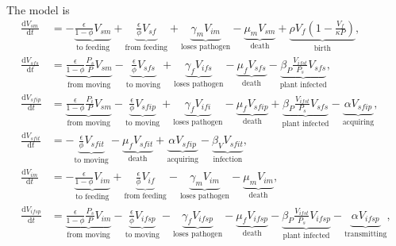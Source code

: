 \documentclass{article}
\newcommand{\md}{\mathrm{d}}
\begin{document}
The model is
\begin{equation}
  \label{odesystem}
  \begin{split}
    \frac{\md V_{sm}}{\md t}
    &=
    - \underbrace{\frac{\epsilon}{1 - \phi} V_{sm}}_{\text{to feeding}}
    + \underbrace{\frac{\epsilon}{\phi} V_{sf}}_{\text{from feeding}}
    + \underbrace{\gamma_m V_{im}}_{\text{loses pathogen}}
    - \underbrace{\mu_m V_{sm}}_{\text{death}}
    + \underbrace{\rho V_f \left(1 - \frac{V_f}{\kappa P}\right)}_{\text{birth}},
    \\
    \frac{\md V_{sfs}}{\md t}
    &=
    \underbrace{\frac{\epsilon}{1 - \phi} \frac{P_s}{P} V_{sm}}_{\text{from moving}}
    - \underbrace{\frac{\epsilon}{\phi} V_{sfs}}_{\text{to moving}}
    + \underbrace{\gamma_f V_{ifs}}_{\text{loses pathogen}}
    - \underbrace{\mu_f V_{sfs}}_{\text{death}}
    - \underbrace{\beta_P \frac{V_{ifst}}{P_s} V_{sfs}}_{\text{plant
        infected}},
    \\
    \frac{\md V_{sfip}}{\md t}
    &=
    \underbrace{\frac{\epsilon}{1 - \phi} \frac{P_i}{P} V_{sm}}_{\text{from moving}}
    - \underbrace{\frac{\epsilon}{\phi} V_{sfip}}_{\text{to moving}}
    + \underbrace{\gamma_f V_{ifi}}_{\text{loses pathogen}}
    - \underbrace{\mu_f V_{sfip}}_{\text{death}}
    + \underbrace{\beta_P \frac{V_{ifst}}{P_s} V_{sfs}}_{\text{plant infected}}
    - \underbrace{\alpha V_{sfip}}_{\text{acquiring}},
    \\
    \frac{\md V_{sfit}}{\md t}
    &=
    - \underbrace{\frac{\epsilon}{\phi} V_{sfit}}_{\text{to moving}}
    - \underbrace{\mu_f V_{sfit}}_{\text{death}}
    + \underbrace{\alpha V_{sfip}}_{\text{acquiring}}
    - \underbrace{\beta_V V_{sfit}}_{\text{infection}},
    \\
    \frac{\md V_{im}}{\md t}
    &=
    - \underbrace{\frac{\epsilon}{1 - \phi} V_{im}}_{\text{to feeding}}
    + \underbrace{\frac{\epsilon}{\phi} V_{if}}_{\text{from feeding}}
    - \underbrace{\gamma_m V_{im}}_{\text{loses pathogen}}
    - \underbrace{\mu_m V_{im}}_{\text{death}},
    \\
    \frac{\md V_{ifsp}}{\md t}
    &=
    \underbrace{\frac{\epsilon}{1 - \phi} \frac{P_s}{P} V_{im}}_{\text{from moving}}
    - \underbrace{\frac{\epsilon}{\phi} V_{ifsp}}_{\text{to moving}}
    - \underbrace{\gamma_f V_{ifsp}}_{\text{loses pathogen}}
    - \underbrace{\mu_f V_{ifsp}}_{\text{death}}
    - \underbrace{\beta_P \frac{V_{ifst}}{P_s} V_{ifsp}}_{\text{plant infected}}
    - \underbrace{\alpha V_{ifsp}}_{\text{transmitting}},
    \\

\end{split}
\end{equation}
\end{document}
